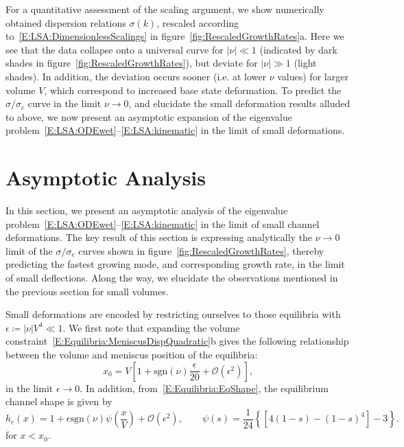 \documentclass{jfm}
\newcommand{\order}[1]{\mathcal{O}\left(#1\right)}
\begin{document}
For a quantitative assessment of the scaling argument, we show numerically obtained dispersion relations $\sigma(k)$, rescaled according to~\eqref{E:LSA:DimensionlessScalings} in figure~\ref{fig:RescaledGrowthRates}a. Here we see that the data collapse onto a universal curve for $|\nu| \ll 1$ (indicated by dark shades in figure~\ref{fig:RescaledGrowthRates}), but deviate for $|\nu|\gg 1$ (light shades). In addition, the deviation occurs sooner (i.e. at lower $\nu$ values) for larger volume $V$, which correspond to increased base state deformation. To predict the $\sigma/\sigma_c$ curve in the limit $\nu \to 0$, and elucidate the small deformation results alluded to above, we now present an asymptotic expansion of the eigenvalue problem~\eqref{E:LSA:ODEwet}--\eqref{E:LSA:kinematic} in the limit of small deformations.


\section{Asymptotic Analysis}\label{S:Asymptotics}
\newcommand{\param}{\delta} %
In this section, we present an asymptotic analysis of the eigenvalue problem~\eqref{E:LSA:ODEwet}--\eqref{E:LSA:kinematic}  in the limit of small channel deformations. The key result of this section is expressing analytically the $\nu \to 0$ limit of the $\sigma/\sigma_c$ curves shown in figure~\ref{fig:RescaledGrowthRates}, thereby predicting the fastest growing mode, and corresponding growth rate, in the limit of small deflections. Along the way, we elucidate the observations mentioned in the previous section for small volumes.

Small deformations are encoded by restricting ourselves to those equilibria with $\epsilon  \coloneqq |\nu| V^4 \ll 1$. We first note that expanding the volume constraint~\eqref{E:Equilibria:MeniscusDispQuadratic}b gives the following relationship between the volume and meniscus position of the  equilibria:
\begin{equation}\label{E:Asymptotics:EqMeniscusPositionExpansion}
    x_0 = V\left[1 + \mathrm{sgn}(\nu) \frac{\epsilon}{20} + \order{\epsilon^2}\right],
\end{equation}
in the limit $\epsilon \to 0$. In addition, from~\eqref{E:Equilibria:EqShape}, the equilibrium channel shape is given by
\begin{equation}\label{E:Asymptotics:EqChannelShapeExpansion}
    h_e(x) = 1 + \epsilon \mathrm{sgn}(\nu)\psi\left(\frac{x}{V}\right) + \order{\epsilon^2}, \qquad \psi(s) = \frac{1}{24}\left\{\left[4(1-s) - (1-s)^4\right]-3\right\}.
\end{equation}
for $x < x_0$.
\end{document}
